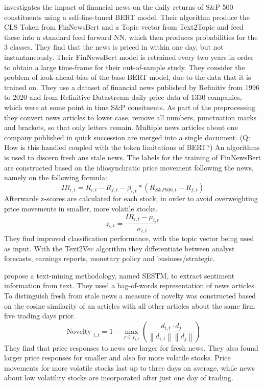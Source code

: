 \documentclass[12pt,a4paper]{article}
\begin{document}
	\textbf{\cite{salbrechter_financial_2021-1}} investigates the impact of financial news on the daily returns of S\&P 500 constituents using a self-fine-tuned BERT model. 
	Their algorithm produce the CLS Token from FinNewsBert and a Topic vector from Text2Topic and feed these into a standard feed forward NN, which then produces probabilities for the 3 classes.
	They find that the news is priced in within one day, but not instantaneously.
	Their FinNewsBert model is retrained every two years in order to obtain a large time-frame for their out-of-sample study.
	They consider the problem of look-ahead-bias of the base BERT model, due to the data that it is trained on.
	They use a dataset of financial news published by Refinitiv from 1996 to 2020 and from Refinitive Datastream daily price data of 1330 companies, which were at some point in time S\&P consituents.
	As part of the preprocessing they convert news articles to lower case, remove all numbers, punctuation marks and brackets, so that only letters remain.
	Multiple news articles about one company published in quick succession are merged into a single document.
	(Q: How is this handled coupled with the token limitations of BERT?)
	An algorithms is used to discern fresh ans stale news.
	The labels for the training of FinNewsBert are constructed based on the idiosynchratic price movement following the news,
	namely on the following formula: 
	$$I R_{i, t}=R_{i, t}-R_{f, t}-\beta_{i, t} *\left(R_{S \& P 500, t}-R_{f, t}\right)$$
	Afterwards z-scores are calculated for each stock, in order to avoid overweighting price movements in smaller, more volatile stocks.
	$$z_{i, t}=\frac{I R_{i, t}-\mu_{i, t}}{\sigma_{i, t}}$$
	They find improved classification performance, with the topic vector being used as input.
	With the Text2Vec algorithm they differentiate between analyst forecasts, earnings reports, monetary policy and business/strategic.
	
	
	\bigskip
	\textbf{\cite{ke_predicting_2020}} propose a text-mining methodology, named SESTM, to extract sentiment information from text. 
	They used a bag-of-words representation of news articles.
	To distinguish fresh from stale news a measure of novelty was constructed based on the cosine similarity of an articles with all other articles about the same firm five trading days prior.
	$$
	\text { Novelty }_{i, t}=1-\max _{j \in \chi_{i, t}}\left(\frac{d_{i, t} \cdot d_j}{\left\|d_{i, t}\right\|\left\|d_j\right\|}\right)
	$$
	They find that price responses to news are larger for fresh news. 
	They also found larger price responses for smaller and also for more volatile stocks.
	Price movements for more volatile stocks last up to three days on average, while news about low volatility stocks are incorporated after just one day of trading.
	
\end{document}
